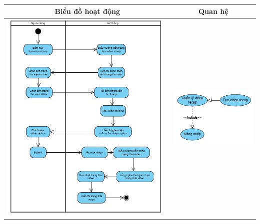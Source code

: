\vspace{0.8cm}

\noindent 
\begin{tabular}{| c | c |}
    \hline
    \textbf{Biểu đồ hoạt động} & \textbf{Quan hệ} \\ 
    \hline
    \includegraphics[width=0.6\linewidth]{figures/c3/3-3-9-activity-diagram.png} 
    &  
    \includegraphics[width=0.35\linewidth]{figures/c3/3-3-9-relationship.png} \\ 
    \hline
\end{tabular}

